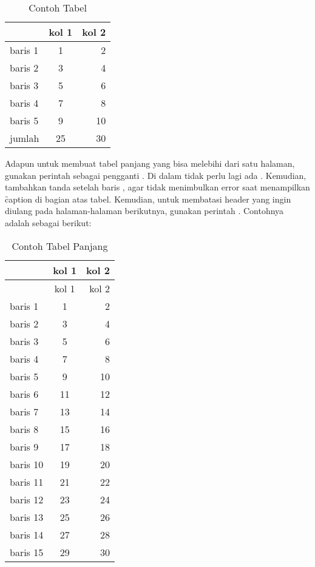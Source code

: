 \begin{table}
	\centering
	\caption{Contoh Tabel}
	\label{tab:tab1}
	\begin{tabular}{| l | c r |}
		\hline
		& kol 1 & kol 2 \\
		\hline
		baris 1 & 1 & 2 \\
		baris 2 & 3 & 4 \\
		baris 3 & 5 & 6 \\
		baris 4 & 7 & 8 \\
		baris 5 & 9 & 10 \\
		\hline
		jumlah  & 25 & 30 \\
		\hline
	\end{tabular}
\end{table}

Adapun untuk membuat tabel panjang yang bisa melebihi dari satu halaman, gunakan perintah  sebagai pengganti . Di dalam  tidak perlu lagi ada . Kemudian, tambahkan tanda \code{\bslash{}\bslash{}} setelah baris , agar tidak menimbulkan error saat menampilkan \f{caption} di bagian atas tabel. Kemudian, untuk membatasi header yang ingin diulang pada halaman-halaman berikutnya, gunakan perintah . Contohnya adalah sebagai berikut:

\begin{longtable}{| l | c r |}
\caption{Contoh Tabel Panjang}
\label{tab:tab2} \\
\hline
& kol 1 & kol 2 \\
\hline
\endfirsthead %
\hline
& kol 1 & kol 2 \\
\hline
\endhead %
baris 1  & 1 & 2 \\
baris 2  & 3 & 4 \\
baris 3  & 5 & 6 \\
baris 4  & 7 & 8 \\
baris 5  & 9 & 10 \\
baris 6  & 11 & 12 \\
baris 7  & 13 & 14 \\
baris 8  & 15 & 16 \\
baris 9  & 17 & 18 \\
baris 10 & 19 & 20 \\
baris 11 & 21 & 22 \\
baris 12 & 23 & 24 \\
baris 13 & 25 & 26 \\
baris 14 & 27 & 28 \\
baris 15 & 29 & 30 \\
\hline
\end{longtable}

